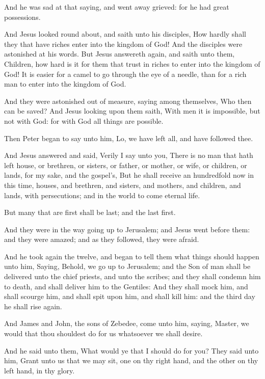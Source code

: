 \Verse And he was sad at that saying, and went away grieved: for he had great possessions.

\Verse And Jesus looked round about, and saith unto his disciples, How hardly shall they that have riches enter into the kingdom of God!  \Verse And the disciples were astonished at his words. But Jesus answereth again, and saith unto them, Children, how hard is it for them that trust in riches to enter into the kingdom of God!  \Verse It is easier for a camel to go through the eye of a needle, than for a rich man to enter into the kingdom of God.

\Verse And they were astonished out of measure, saying among themselves, Who then can be saved?  \Verse And Jesus looking upon them saith, With men it is impossible, but not with God: for with God all things are possible.

\Verse Then Peter began to say unto him, Lo, we have left all, and have followed thee.

\Verse And Jesus answered and said, Verily I say unto you, There is no man that hath left house, or brethren, or sisters, or father, or mother, or wife, or children, or lands, for my sake, and the gospel's, \Verse But he shall receive an hundredfold now in this time, houses, and brethren, and sisters, and mothers, and children, and lands, with persecutions; and in the world to come eternal life.

\Verse But many that are first shall be last; and the last first.

\Verse And they were in the way going up to Jerusalem; and Jesus went before them: and they were amazed; and as they followed, they were afraid.

And he took again the twelve, and began to tell them what things should happen unto him, \Verse Saying, Behold, we go up to Jerusalem; and the Son of man shall be delivered unto the chief priests, and unto the scribes; and they shall condemn him to death, and shall deliver him to the Gentiles: \Verse And they shall mock him, and shall scourge him, and shall spit upon him, and shall kill him: and the third day he shall rise again.

\Verse And James and John, the sons of Zebedee, come unto him, saying, Master, we would that thou shouldest do for us whatsoever we shall desire.

\Verse And he said unto them, What would ye that I should do for you?  \Verse They said unto him, Grant unto us that we may sit, one on thy right hand, and the other on thy left hand, in thy glory.

